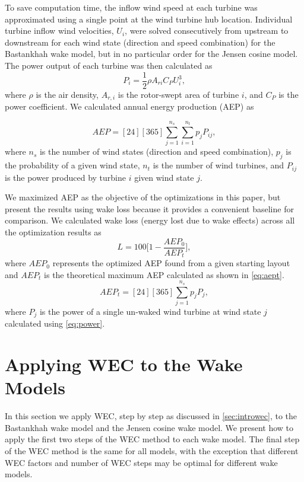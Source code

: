 \documentclass[hidelinks,sort&compress,AMA,STIX1COL]{WileyNJD-v2}
\begin{document}
To save computation time, the inflow wind speed at each turbine was approximated using a single point at the wind turbine hub location. Individual turbine inflow wind velocities, $U_i$, were solved consecutively from upstream to downstream for each wind state (direction and speed combination) for the Bastankhah wake model, but in no particular order for the Jensen cosine model. The power output of each turbine was then calculated as
%
\begin{equation}\label{eq:power}
P_i = \frac{1}{2}\rho A_{ri}C_P U_i^3,
\end{equation}
%
where $\rho$ is the air density, $A_{r,i}$ is the rotor-swept area of turbine $i$, and $C_P$ is the power coefficient. We calculated annual energy production (AEP) as

\begin{equation} \label{eq:aep}
AEP = [24][365]\sum_{j=1}^{n_s} \sum_{i=1}^{n_t} p_j P_{ij},
\end{equation}
%
 where $n_s$ is the number of wind states (direction and speed combination), $p_j$ is the probability of a given wind state, $n_t$ is the number of wind turbines, and $P_{ij}$ is the power produced by turbine $i$ given wind state $j$.

We maximized AEP as the objective of the optimizations in this paper, but present the results using wake loss because it provides a convenient baseline for comparison. We calculated wake loss (energy lost due to wake effects) across all the optimization results as
%
\begin{equation} \label{eq:wake_loss}
	L = 100 \bigg[ 1 - \frac{AEP_0}{AEP_t} \bigg],
\end{equation}
%
where $AEP_0$ represents the optimized AEP found from a given starting layout and $AEP_t$ is the theoretical maximum AEP calculated as shown in \cref{eq:aept}. 
%
\begin{equation} \label{eq:aept}
	AEP_t = [24][365]\sum_{j=1}^{n_s}p_j P_j,
\end{equation}
%
where $P_j$ is the power of a single un-waked wind turbine at wind state $j$ calculated using \cref{eq:power}. 


\section{Applying WEC to the  Wake Models} \label{sec:application}
In this section we apply WEC, step by step as discussed in \cref{sec:introwec}, to the Bastankhah wake model and the Jensen cosine wake model. We present how to apply the first two steps of the WEC method to each wake model. The final step of the WEC method is the same for all models, with the exception that different WEC factors and number of WEC steps may be optimal for different wake models.
\end{document}
